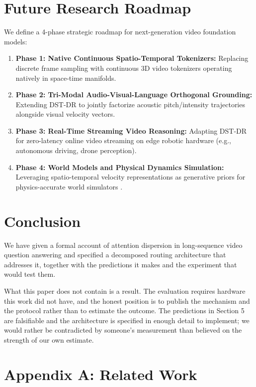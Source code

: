 \documentclass[10pt,journal,compsoc,twocolumn]{IEEEtran}
\begin{document}
\section{Future Research Roadmap}


We define a 4-phase strategic roadmap for next-generation video foundation models:
\begin{enumerate}
  \item \textbf{Phase 1: Native Continuous Spatio-Temporal Tokenizers:} Replacing discrete frame sampling with continuous 3D video tokenizers operating natively in space-time manifolds.
  \item \textbf{Phase 2: Tri-Modal Audio-Visual-Language Orthogonal Grounding:} Extending DST-DR to jointly factorize acoustic pitch/intensity trajectories alongside visual velocity vectors.
  \item \textbf{Phase 3: Real-Time Streaming Video Reasoning:} Adapting DST-DR for zero-latency online video streaming on edge robotic hardware (e.g., autonomous driving, drone perception).
  \item \textbf{Phase 4: World Models and Physical Dynamics Simulation:} Leveraging spatio-temporal velocity representations as generative priors for physics-accurate world simulators \cite{arxiv_2501_02497}.
\end{enumerate}




\section{Conclusion}


We have given a formal account of attention dispersion in long-sequence video question answering and specified a decomposed routing architecture that addresses it, together with the predictions it makes and the experiment that would test them.

What this paper does not contain is a result. The evaluation requires hardware this work did not have, and the honest position is to publish the mechanism and the protocol rather than to estimate the outcome. The predictions in Section 5 are falsifiable and the architecture is specified in enough detail to implement; we would rather be contradicted by someone's measurement than believed on the strength of our own estimate.




\section{Appendix A: Related Work}
\end{document}
